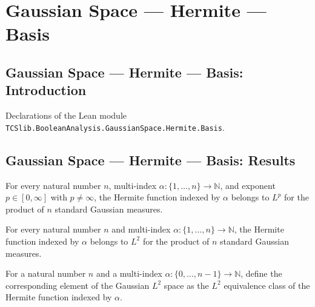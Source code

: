 \section{Gaussian Space --- Hermite --- Basis}
\subsection*{Gaussian Space --- Hermite --- Basis: Introduction}

Declarations of the Lean module \texttt{TCSlib.BooleanAnalysis.GaussianSpace.Hermite.Basis}.

\subsection*{Gaussian Space --- Hermite --- Basis: Results}

\begin{theorem}
\label{BooleanAnalysis.GaussianSpace.hermiteFunction_memLp}
\leanok
{}
For every natural number $n$, multi-index $\alpha:\{1,\ldots,n\}\to\mathbb N$, and
exponent $p\in[0,\infty]$ with $p\ne\infty$, the Hermite function indexed by $\alpha$
belongs to $L^p$ for the product of $n$ standard Gaussian measures.
\end{theorem}

\begin{theorem}
\label{BooleanAnalysis.GaussianSpace.hermiteFunction_memLp_two}
\leanok
{}
For every natural number $n$ and multi-index $\alpha:\{1,\ldots,n\}\to\mathbb N$, the
Hermite function indexed by $\alpha$ belongs to $L^2$ for the product of $n$ standard
Gaussian measures.
\end{theorem}

\begin{definition}
\label{BooleanAnalysis.GaussianSpace.hermiteL2}
\leanok
{}
For a natural number $n$ and a multi-index $\alpha:\{0,\ldots,n-1\}\to\mathbb N$, define
the corresponding element of the Gaussian $L^2$ space as the $L^2$ equivalence class of
the Hermite function indexed by $\alpha$.
\end{definition}

